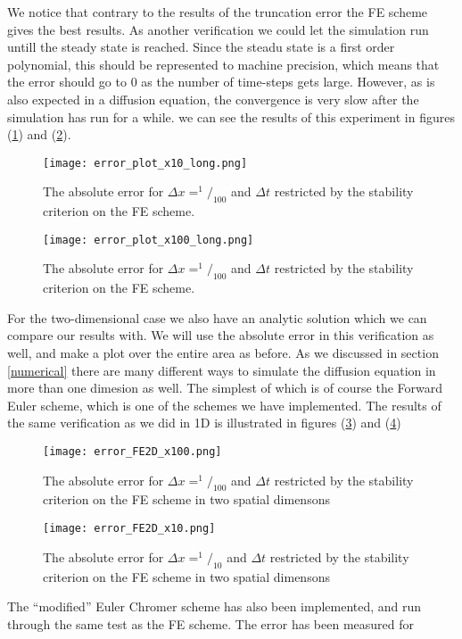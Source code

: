 \documentclass[a4paper,english, 10pt, twoside]{article}
\begin{document}
We notice that contrary to the results of the truncation error the FE scheme gives the best results. As another verification we could let the 
simulation run untill the steady state is reached. Since the steadu state is a first order polynomial, this should be represented to machine precision, 
which means that the error should go to 0 as the number of time-steps gets large. However, as is also expected in a diffusion equation, the 
convergence is very slow after the simulation has run for a while. we can see the results of this experiment in figures (\ref{errors_nx10_long}) and 
(\ref{errors_nx100_long}).
\begin{figure}[H]
 \centering
 \texttt{[image: error\_plot\_x10\_long.png]}
 \caption{The absolute error for $\Delta x = ^1/_{100}$ and $\Delta t$ restricted by the stability criterion on the FE scheme. }
 \label{errors_nx10_long}
\end{figure}
\begin{figure}[H]
 \centering
 \texttt{[image: error\_plot\_x100\_long.png]}
 \caption{The absolute error for $\Delta x = ^1/_{100}$ and $\Delta t$ restricted by the stability criterion on the FE scheme.}
 \label{errors_nx100_long}
\end{figure}
For the two-dimensional case we also have an analytic solution which we can compare our results with. We will use the absolute error in this 
verification as well, and make a plot over the entire area as before. As we discussed in section \ref{numerical} there are many different ways 
to simulate the diffusion equation in more than one dimesion as well. The simplest of which is of course the Forward Euler scheme, which is one of 
the schemes we have implemented. The results of the same verification as we did in 1D is illustrated in figures (\ref{errors_FE2D_nx100}) and 
(\ref{errors_FE2D_nx10})
\begin{figure}[H]
 \centering
 \texttt{[image: error\_FE2D\_x100.png]}
 \caption{The absolute error for $\Delta x = ^1/_{100}$ and $\Delta t$ restricted by the stability criterion on the FE scheme in two spatial dimensons }
 \label{errors_FE2D_nx100}
\end{figure}
\begin{figure}[H]
 \centering
 \texttt{[image: error\_FE2D\_x10.png]}
 \caption{The absolute error for $\Delta x = ^1/_{10}$ and $\Delta t$ restricted by the stability criterion on the FE scheme in two spatial dimensons }
 \label{errors_FE2D_nx10}
\end{figure}
The ``modified'' Euler Chromer scheme has also been implemented, and run through the same test as the FE scheme. The error has been measured for 
\end{document}
